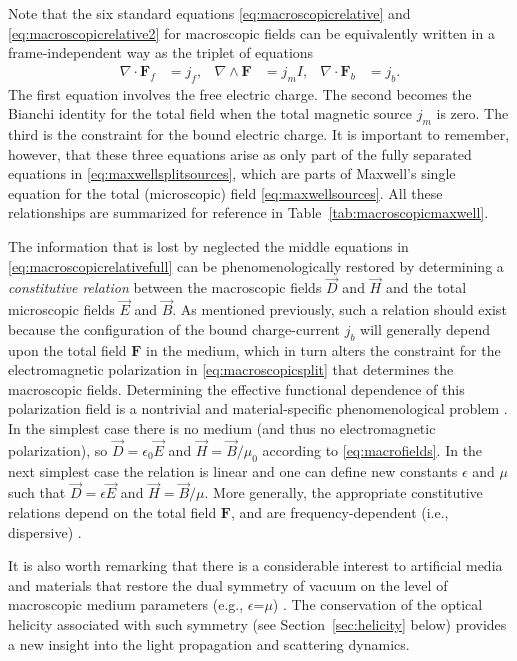 \documentclass[1p,sort&compress]{elsarticle}
\numberwithin{equation}{section}
\newcommand{\rv}[1]{\vec{#1}}
\newcommand{\bv}[1]{\mathbf{#1}}
\begin{document}
Note that the six standard equations \eqref{eq:macroscopicrelative} and \eqref{eq:macroscopicrelative2} for macroscopic fields can be equivalently written in a frame-independent way as the triplet of equations \cite{Doran2007}
\begin{align}\label{eq:macroscopicproper}
  \nabla\cdot \bv{F}_f &= j_f, & \nabla\wedge \bv{F} &= j_m I, & \nabla\cdot \bv{F}_b &= j_b.
\end{align}
The first equation involves the free electric charge. The second becomes the Bianchi identity for the total field when the total magnetic source $j_m$ is zero.  The third is the constraint for the bound electric charge.  It is important to remember, however, that these three equations arise as only part of the fully separated equations in \eqref{eq:maxwellsplitsources}, which are parts of Maxwell's single equation for the total (microscopic) field \eqref{eq:maxwellsources}.  All these relationships are summarized for reference in Table~\ref{tab:macroscopicmaxwell}.

The information that is lost by neglected the middle equations in \eqref{eq:macroscopicrelativefull} can be phenomenologically restored by determining a \emph{constitutive relation} between the macroscopic fields $\rv{D}$ and $\rv{H}$ and the total microscopic fields $\rv{E}$ and $\rv{B}$.  As mentioned previously, such a relation should exist because the configuration of the bound charge-current $j_b$ will generally depend upon the total field $\bv{F}$ in the medium, which in turn alters the constraint for the electromagnetic polarization in \eqref{eq:macroscopicsplit} that determines the macroscopic fields.  Determining the effective functional dependence of this polarization field is a nontrivial and material-specific phenomenological problem \cite{Jackson1999,Landau1984}.  In the simplest case there is no medium (and thus no electromagnetic polarization), so $\rv{D} = \epsilon_0 \rv{E}$ and $\rv{H} = \rv{B}/\mu_0$ according to \eqref{eq:macrofields}.  In the next simplest case the relation is linear and one can define new constants $\epsilon$ and $\mu$ such that $\rv{D} = \epsilon \rv{E}$ and $\rv{H} = \rv{B}/\mu$.  More generally, the appropriate constitutive relations depend on the total field $\bv{F}$, and are frequency-dependent (i.e., dispersive) \cite{Jackson1999,Landau1984,Milonni2004}.

It is also worth remarking that there is a considerable interest to artificial media and materials that restore the dual symmetry of vacuum on the level of macroscopic medium parameters (e.g., $\epsilon$=$\mu$) \cite{Bialynicki-Birula1996,Savchenko1994,Fernandez2012,Fernandez2013,Zambrana2013,Philbin2013,Tischler2014}. The conservation of the optical helicity associated with such symmetry (see Section~\ref{sec:helicity} below) provides a new insight into the light propagation and scattering dynamics.
\end{document}
